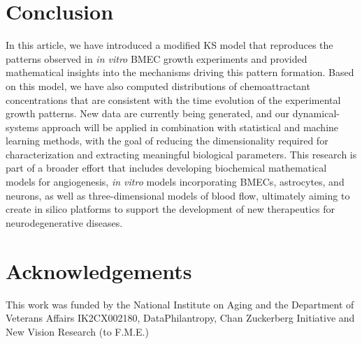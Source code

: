 \documentclass[final,1p,times]{elsarticle}
\begin{document}
\section{Conclusion}
In this article, we have introduced a modified KS model that reproduces the patterns observed in \textit{ in vitro} BMEC growth experiments and provided mathematical insights into the mechanisms driving this pattern formation. Based on this model, we have also computed distributions of chemoattractant concentrations that are consistent with the time evolution of the experimental growth patterns. New data are currently being generated, and our dynamical-systems approach will be applied in combination with statistical and machine learning methods, with the goal of reducing the dimensionality required for characterization and extracting meaningful biological parameters. This research is part of a broader effort that includes developing biochemical mathematical models for angiogenesis, \textit{ in vitro} models incorporating BMECs, astrocytes, and neurons, as well as three-dimensional models of blood flow, ultimately aiming to create in silico platforms to support the development of new therapeutics for neurodegenerative diseases.


\section*{Acknowledgements}
This work was funded by the National Institute on Aging and the Department of 
Veterans Affairs IK2CX002180, DataPhilantropy, Chan Zuckerberg Initiative and
New Vision Research (to F.M.E.)
\appendix
\end{document}
